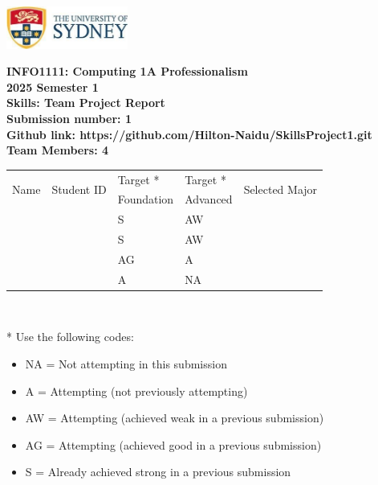 \documentclass[a4paper, 11pt]{report}
\begin{document}
\begin{titlepage}
\begin{flushright}
\includegraphics[width=4cm]{USyd.jpg}\\[1cm]
\end{flushright}

\begin{centering}
\textbf{\huge INFO1111: Computing 1A Professionalism}\\[0.75cm]
\textbf{\huge 2025 Semester 1}\\[2cm]
\textbf{\huge Skills: Team Project Report}\\[2cm]

\textbf{\large Submission number: 1}\\[0.5cm]
\textbf{\large Github link: https://github.com/Hilton-Naidu/SkillsProject1.git }\\[0.75cm]
\textbf{\huge Team Members: 4}\\[0.75cm]

\begin{tabular}{|p{}|p{}|p{}|p{}|p{}|}
	\hline
	\multirow{2}{*}{Name} & \multirow{2}{*}{Student ID} & Target * & Target * & \multirow{2}{*}{Selected Major} \\
	 & & Foundation & Advanced & \\
	\hline
	\hline
	\raggedright{\studA} & \sidA & S & AW & \majA \\
	\hline
	\raggedright{\studB} & \sidB & S & AW & \majB \\
	\hline
	\raggedright{\studC} & \sidC & AG & A & \majC \\
	\hline
	\raggedright{\studD} & \sidD & A & NA & \majD \\
	\hline
\end{tabular}
\\[0.5cm]
\end{centering}

* Use the following codes:
\begin{itemize}
\setlength\itemsep{0em}
\item NA = Not attempting in this submission
\item A = Attempting (not previously attempting)
\item AW = Attempting (achieved weak in a previous submission) 
\item AG = Attempting (achieved good in a previous submission)
\item S = Already achieved strong in a previous submission
\end{itemize}

\thispagestyle{empty}
\end{titlepage}
\end{document}
